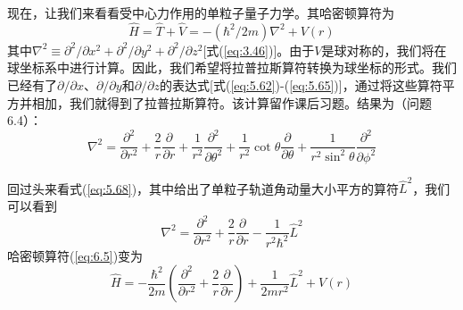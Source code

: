     现在，让我们来看看受中心力作用的单粒子量子力学。其哈密顿算符为
    \begin{equation}
        \hat{H} = \hat{T} + \hat{V} = -\left(\hbar^2/2m\right)\nabla^2 + V\left(r\right)
        \label{eq:6.5}
    \end{equation}
    其中$\nabla^2 \equiv \partial^2/\partial x^2 + \partial^2/\partial y^2 + \partial^2/\partial z^2$[式(\ref{eq:3.46})]。由于$V$是球对称的，我们将在球坐标系中进行计算。因此，我们希望将拉普拉斯算符转换为球坐标的形式。我们已经有了$\partial/\partial x$、$\partial/\partial y$和$\partial /\partial z$的表达式[式(\ref{eq:5.62})-(\ref{eq:5.65})]，通过将这些算符平方并相加，我们就得到了拉普拉斯算符。该计算留作课后习题。结果为（问题6.4）：
    \begin{equation}
        \nabla^2 = \frac{\partial^2}{\partial r^2} + \frac{2}{r}\frac{\partial}{\partial r} + \frac{1}{r^2}\frac{\partial^2}{\partial\theta^2} + \frac{1}{r^2}\cot\theta\frac{\partial}{\partial\theta} + \frac{1}{r^2\sin^2\theta}\frac{\partial^2}{\partial\phi^2}
        \label{eq:6.6}
    \end{equation}

    回过头来看式(\ref{eq:5.68})，其中给出了单粒子轨道角动量大小平方的算符$\hat{L}^2$，我们可以看到
    \begin{equation}
        \nabla^2 = \frac{\partial^2}{\partial r^2} + \frac{2}{r}\frac{\partial}{\partial r} - \frac{1}{r^2\hbar^2}\hat{L}^2
        \label{eq:6.7}
    \end{equation}
    哈密顿算符(\ref{eq:6.5})变为
    \begin{equation}
        \hat{H} = -\frac{\hbar^2}{2m}\left(\frac{\partial^2}{\partial r^2} + \frac{2}{r}\frac{\partial}{\partial r}\right) + \frac{1}{2mr^2}\hat{L}^2 + V\left(r\right)
        \label{eq:6.8}
    \end{equation}

